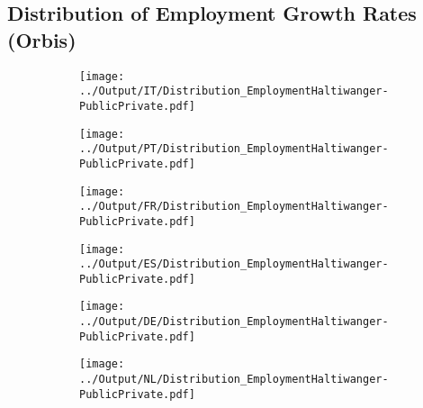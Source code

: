 \documentclass[12pt,notitlepage]{article}
\begin{document}
\subsection{Distribution of Employment Growth Rates (Orbis)}
\begin{figure}[!htpb]
\centering
\begin{subfigure}{.49\textwidth}
    \centering
 \texttt{[image: ../Output/IT/Distribution\_EmploymentHaltiwanger-PublicPrivate.pdf]}
\end{subfigure}%
\begin{subfigure}{.49\textwidth}
    \centering
 \texttt{[image: ../Output/PT/Distribution\_EmploymentHaltiwanger-PublicPrivate.pdf]}
\end{subfigure}
\begin{subfigure}{.49\textwidth}
    \centering
 \texttt{[image: ../Output/FR/Distribution\_EmploymentHaltiwanger-PublicPrivate.pdf]}
\end{subfigure}%
\begin{subfigure}{.49\textwidth}
    \centering
 \texttt{[image: ../Output/ES/Distribution\_EmploymentHaltiwanger-PublicPrivate.pdf]}
\end{subfigure}
\begin{subfigure}{.49\textwidth}
    \centering
 \texttt{[image: ../Output/DE/Distribution\_EmploymentHaltiwanger-PublicPrivate.pdf]}
\end{subfigure}
\begin{subfigure}{.49\textwidth}
    \centering
 \texttt{[image: ../Output/NL/Distribution\_EmploymentHaltiwanger-PublicPrivate.pdf]}
\end{subfigure}
\end{figure}
\end{document}
